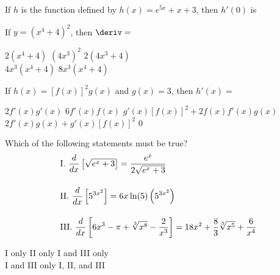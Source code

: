 \begin{questions}
    \question If $h$ is the function defined by $h(x) = e^{5x} + x + 3$, then $h'(0) $ is \\

    \begin{oneparchoices}
    \end{oneparchoices} \par \horizontalline

    \question If $y = \left(x^4 + 4\right)^2$, then $\deriv = $ \\

    \begin{oneparchoices}
        \choice $2\left(x^4 + 4\right)$
        \choice $\left(4x^3\right)^2$
        \choice $2\left(4x^3 + 4\right)$ \\[11pt]
        \makebox[0.23 \textwidth] \choice $4x^3\left(x^4 + 4\right)$
        \makebox[0.25 \textwidth] \choice $8x^3\left(x^4 + 4\right)$
    \end{oneparchoices} \par \horizontalline

    \question If $h(x) = \left[f(x)\right]^2 g(x)$ and $g(x) = 3$, then $h'(x) = $ \\

    \begin{oneparchoices}
        \choice $2f'(x)g'(x)$
        \choice $6f'(x)f(x)$
        \choice $g'(x)\left[f(x)\right]^2 + 2f(x)f'(x)g(x)$ \\[11pt]
        \makebox[0.23 \textwidth] \choice $2f'(x)g(x) + g'(x)\left[f(x)\right]^2$
        \makebox[0.25 \textwidth] \choice $0$
    \end{oneparchoices} \par \horizontalline

    \question Which of the following statements must be true?
    \begin{align*}
        & \text{I. } \dfrac{d}{dx} \left[\sqrt{e^x + 3}\right] = \dfrac{e^x}{2\sqrt{e^x + 3}} \\[11pt]
        & \text{II. } \dfrac{d}{dx} \left[5^{3x^2}\right] = 6x\ln (5)\left(5^{3x^2}\right) \\[11pt]
        & \text{III. } \dfrac{d}{dx} \left[6x^3 - \pi + \sqrt[3]{x^8} - \dfrac{2}{x^3}\right] = 18x^2 + \dfrac{8}{3}\sqrt[3]{x^5} + \dfrac{6}{x^4}
    \end{align*}

    \begin{oneparchoices}
        \choice I only 
        \choice II only 
        \choice I and III only \\[11pt]
        \makebox[0.2 \textwidth] \choice I and III only 
        \makebox[0.25 \textwidth] \choice I, II, and III
    \end{oneparchoices} \par \horizontalline
\end{questions}
